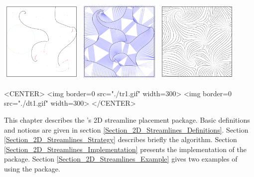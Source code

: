 \newcommand{\streamlinecomment}[1]{}


\begin{ccTexOnly}
\begin{center}
\includegraphics[width=4cm]{Stream_lines_2/1} \hspace*{0.5cm} 
\includegraphics[width=4cm]{Stream_lines_2/2} \hspace*{0.5cm} 
\includegraphics[width=4cm]{Stream_lines_2/3} 
\end{center}
\end{ccTexOnly}

\begin{ccHtmlOnly}
<CENTER>
<img border=0 src="./tr1.gif" width=300>
<img border=0 src="./dt1.gif" width=300>
</CENTER>
\end{ccHtmlOnly}

This chapter describes the \cgal's 2D streamline placement package.
Basic definitions and notions are given in section
\ref{Section_2D_Streamlines_Definitions}. Section
\ref{Section_2D_Streamlines_Strategy} describes briefly the algorithm. Section
\ref{Section_2D_Streamlines_Implementation} presents the implementation of the package. Section
\ref{Section_2D_Streamlines_Example} gives two examples of using the package.

